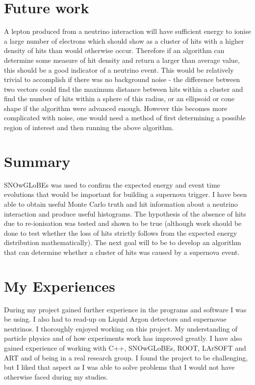 \documentclass[a4paper,12,oneside,notitlepage]{report}
\begin{document}
\section*{\fontsize{11}{11}\selectfont Future work}
A lepton produced from a neutrino interaction will have sufficient energy to ionise a large number of electrons which should show as a cluster of hits with a higher density of hits than would otherwise occur. Therefore if an algorithm can determine some measure of hit density and return a larger than average value, this should be a good indicator of a neutrino event. This would be relatively trivial to accomplish if there was no background noise - the difference between two vectors could find the maximum distance between hits within a cluster and find the number of hits within a sphere of this radius, or an ellipsoid or cone shape if the algorithm were advanced enough. However this becomes more complicated with noise, one would need a method of first determining a possible region of interest and then running the above algorithm.


\section*{\fontsize{11}{11}\selectfont Summary}
SNOwGLoBEs was used to confirm the expected energy and event time evolutions that would be important for building a supernova trigger. I have been able to obtain useful Monte Carlo truth and hit information about a neutrino interaction and produce useful histograms. The hypothesis of the absence of hits due to re-ionisation was tested and shown to be true (although work should be done to test whether the loss of hits strictly follows from the expected energy distribution mathematically). The next goal will to be to develop an algorithm that can determine whether a cluster of hits was caused by a supernova event.

\newpage
\section*{\fontsize{11}{11}\selectfont My Experiences}
During my project gained further experience in the programs and software I was be using. I also had to read-up on Liquid Argon detectors and supernovae neutrinos. I thoroughly enjoyed working on this project. My understanding of particle physics and of how experiments work has improved greatly. I have also gained experience of working with C++, SNOwGLoBEs, ROOT, LArSOFT and ART and of being in a real research group. I found the project to be challenging, but I liked that aspect as I was able to solve problems that I would not have otherwise faced during my studies.
\end{document}
